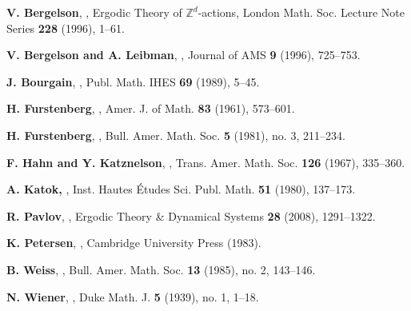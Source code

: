 \documentclass[reqno]{amsart}
\theoremstyle{definition}
\theoremstyle{remark}
\numberwithin{equation}{section}
\numberwithin{theorem}{section}
\begin{document}

\begin{thebibliography}{99}

{\bf V. Bergelson},
,
\newblock Ergodic Theory of ${\mathbb{Z}}^d$-actions, London Math. Soc. Lecture Note Series {\bf 228} (1996), 1--61.

{\bf V. Bergelson and A. Leibman},
,
\newblock Journal of AMS {\bf 9} (1996), 725--753.

{\bf J. Bourgain},
,
\newblock Publ. Math. IHES {\bf 69} (1989), 5--45.

{\bf H. Furstenberg},
,
\newblock Amer. J. of Math. {\bf 83} (1961), 573--601.

{\bf H. Furstenberg},
,
\newblock  Bull. Amer. Math. Soc. {\bf 5} (1981), no. 3, 211--234.

{\bf F. Hahn and Y. Katznelson},
,
\newblock Trans. Amer. Math. Soc. {\bf 126} (1967), 335--360.

{\bf A. Katok,}
,
\newblock Inst. Hautes Études Sci. Publ. Math. {\bf 51} (1980), 137--173.

{\bf R. Pavlov},
,
\newblock Ergodic Theory \& Dynamical Systems {\bf 28} (2008), 1291--1322.

{\bf K. Petersen},
,
\newblock Cambridge University Press (1983).

{\bf B. Weiss},
,
\newblock Bull. Amer. Math. Soc. {\bf 13} (1985), no. 2, 143--146.

{\bf N. Wiener},
,
\newblock Duke Math. J. {\bf 5} (1939), no. 1, 1--18.

\end{thebibliography}
\end{document}

